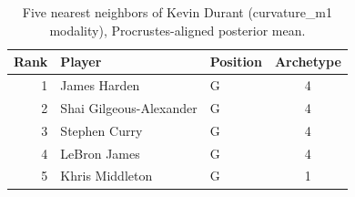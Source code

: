 \begin{table}[htbp]
  \centering\small
  \begin{tabular}{rllc}
    \toprule
    Rank & Player & Position & Archetype \\
    \midrule
    1 & James Harden & G & 4 \\
    2 & Shai Gilgeous-Alexander & G & 4 \\
    3 & Stephen Curry & G & 4 \\
    4 & LeBron James & G & 4 \\
    5 & Khris Middleton & G & 1 \\
    \bottomrule
  \end{tabular}
  \caption{Five nearest neighbors of Kevin Durant (curvature_m1 modality), Procrustes-aligned posterior mean.}
  \label{tab:Kevin_Durant_neighbors_curvature_m1}
\end{table}

